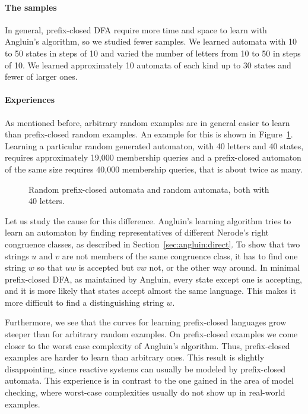 \paragraph{The samples}
In general, prefix-closed DFA require more time and space to learn
with Angluin's algorithm, so we studied fewer samples. We learned
automata with 10 to 50 states in steps of 10 and varied the number of
letters from 10 to 50 in steps of 10. We learned approximately 10
automata of each kind up to 30 states and fewer of larger ones.

\paragraph{Experiences}
As mentioned before, arbitrary random examples are in general easier
to learn than prefix-closed random examples. An example for this is
shown in Figure~\ref{fig:pic_randomPrefixClosed_single}. Learning a
particular random generated automaton, with 40 letters and 40 states, requires
approximately 19,000 membership queries and a prefix-closed automaton
of the same size requires 40,000 membership queries, that is about
twice as many.

\begin{figure}
  \begin{center}
    \caption{Random prefix-closed automata and random automata, both with
40 letters.\label{fig:pic_randomPrefixClosed_single}}
  \end{center}
\end{figure}

Let us study the cause for this difference. Angluin's learning
algorithm tries to learn an automaton by finding representatives of
different Nerode's right congruence classes, as described in
Section~\ref{sec:angluin:direct}. To show that two strings $u$ and $v$
are not members of the same congruence class, it has to find one
string $w$ so that $uw$ is accepted but $vw$ not, or the other way
around. In minimal prefix-closed DFA, as maintained by Angluin, every
state except one is accepting, and it is more likely that states
accept almost the same language. This makes it more difficult to find
a distinguishing string $w$.

Furthermore, we see that the curves for learning prefix-closed
languages grow steeper than for arbitrary random examples. On
prefix-closed examples we come closer to the worst case complexity of
Angluin's algorithm. Thus, prefix-closed examples are harder to learn
than arbitrary ones. This result is slightly disappointing, since
reactive systems can usually be modeled by prefix-closed automata.
This experience is in contrast to the one gained in the area of model
checking, where worst-case complexities usually do not show up in
real-world examples.

